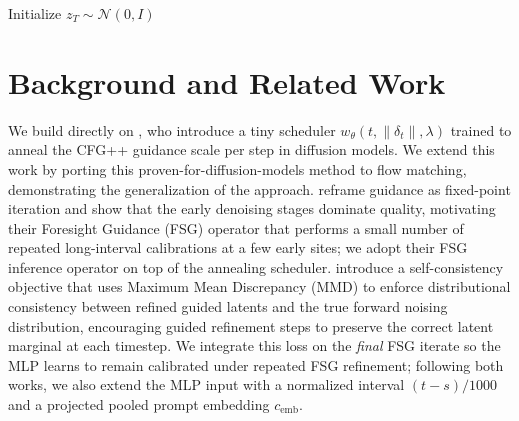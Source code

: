 \documentclass[acmtog]{acmart}
\begin{document}
\begin{algorithm}[t]
\caption{CFG++ Inference with Annealing Guidance (Flow Matching / SD3)}

Initialize $z_T \sim \mathcal{N}(0, I)$\;


\end{algorithm}


\section{Background and Related Work}
We build directly on \citet{dahary2025annealing}, who introduce a tiny scheduler $w_\theta(t,\|\delta_t\|,\lambda)$ trained to anneal the CFG++ guidance scale per step in diffusion models. We extend this work by porting this proven-for-diffusion-models method to flow matching, demonstrating the generalization of the approach.
\citet{fsg2025} reframe guidance as fixed-point iteration and show that the early denoising stages dominate quality, motivating their Foresight Guidance (FSG) operator that performs a small number of repeated long-interval calibrations at a few early sites; we adopt their FSG inference operator on top of the annealing scheduler.
\citet{learn2guide2025} introduce a self-consistency objective that uses Maximum Mean Discrepancy (MMD) to enforce distributional consistency between refined guided latents and the true forward noising distribution, encouraging guided refinement steps to preserve the correct latent marginal at each timestep. We integrate this loss on the \emph{final} FSG iterate so the MLP learns to remain calibrated under repeated FSG refinement; following both works, we also extend the MLP input with a normalized interval $(t-s)/1000$ and a projected pooled prompt embedding $c_{\text{emb}}$.
\end{document}
